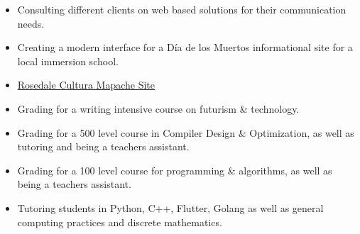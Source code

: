 \documentclass[10pt,a4paper,ragged2e,withhyper]{altacv}
\begin{document}

    \makecvheader



    \begin{paracol}{2}


      \begin{itemize}
          \item Consulting different clients on web based solutions for their communication needs.
          \item Creating a modern interface for a Día de los Muertos informational site for a local immersion school.
          \item \href{https://www.culturamapache.com}{Rosedale Cultura Mapache Site}
      \end{itemize}

      \begin{itemize}
        \item Grading for a writing intensive course on futurism \& technology.
        \item Grading for a 500 level course in Compiler Design \& Optimization, as well as tutoring and being a teachers assistant.
        \item Grading for a 100 level course for programming \& algorithms, as well as being a teachers assistant.
      \end{itemize}

      \divider

      \begin{itemize}
        \item Tutoring students in Python, C++, Flutter, Golang as well as general computing practices and discrete mathematics.
      \end{itemize}


\end{paracol}
\end{document}
